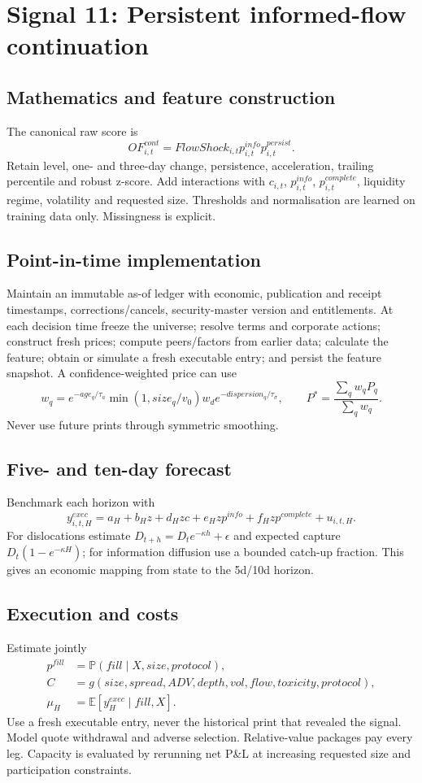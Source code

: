\documentclass[10pt]{article}
\newcommand{\E}{\mathbb{E}}\newcommand{\Pp}{\mathbb{P}}
\begin{document}
\section{Signal 11: Persistent informed-flow continuation}
\subsection{Mathematics and feature construction}
The canonical raw score is
\begin{equation}OF^{cont}_{i,t}=FlowShock_{i,t}p^{info}_{i,t}p^{persist}_{i,t}.\end{equation}
Retain level, one- and three-day change, persistence, acceleration, trailing percentile and robust z-score. Add interactions with $c_{i,t}$, $p^{info}_{i,t}$, $p^{complete}_{i,t}$, liquidity regime, volatility and requested size. Thresholds and normalisation are learned on training data only. Missingness is explicit.

\subsection{Point-in-time implementation}
Maintain an immutable as-of ledger with economic, publication and receipt timestamps, corrections/cancels, security-master version and entitlements. At each decision time freeze the universe; resolve terms and corporate actions; construct fresh prices; compute peers/factors from earlier data; calculate the feature; obtain or simulate a fresh executable entry; and persist the feature snapshot. A confidence-weighted price can use
\[w_q=e^{-age_q/\tau_a}\min(1,size_q/v_0)w_d e^{-dispersion_q/\tau_\sigma},\qquad P^*=\frac{\sum_qw_qP_q}{\sum_qw_q}.\]
Never use future prints through symmetric smoothing.

\subsection{Five- and ten-day forecast}
Benchmark each horizon with
\[y^{exec}_{i,t,H}=a_H+b_Hz+d_Hzc+e_Hzp^{info}+f_Hzp^{complete}+u_{i,t,H}.\]
For dislocations estimate $D_{t+h}=D_te^{-\kappa h}+\epsilon$ and expected capture $D_t(1-e^{-\kappa H})$; for information diffusion use a bounded catch-up fraction. This gives an economic mapping from state to the 5d/10d horizon.

\subsection{Execution and costs}
Estimate jointly
\begin{align}
p^{fill}&=\Pp(fill\mid X,size,protocol),\\
C&=g(size,spread,ADV,depth,vol,flow,toxicity,protocol),\\
\mu_H&=\E[y^{exec}_H\mid fill,X].
\end{align}
Use a fresh executable entry, never the historical print that revealed the signal. Model quote withdrawal and adverse selection. Relative-value packages pay every leg. Capacity is evaluated by rerunning net P\&L at increasing requested size and participation constraints.
\end{document}
